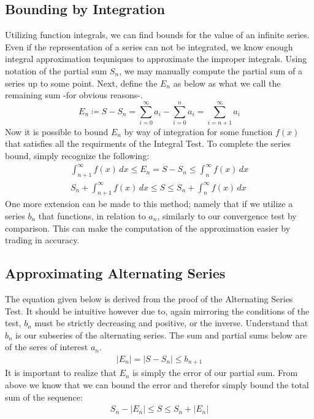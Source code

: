 \documentclass[11pt]{article}
\newcommand{\define}{\coloneqq}
\newcommand{\abs}[1]{\left| #1 \right|}
\begin{document}
	\subsection*{Bounding by Integration}
		Utilizing function integrals, we can find bounds for the value of an infinite series. Even if the representation of a series can not
		be integrated, we know enough integral approximation tequniques to approximate the improper integrals. Using notation of the 
		partial sum $S_n$, we may manually compute the partial sum of a series up to some point. Next, define the $E_n$ as below as what
		we call the remaining sum -for obvious reasons-.
			\begin{equation}
				E_n \define S - S_n = \sum_{i = 0}^{\infty} a_i - \sum_{i = 0}^{n} a_i = \sum_{i = n + 1}^{\infty} a_i
			\end{equation}
		Now it is possible to bound $E_n$ by way of integration for some function $f(x)$ that satisfies all the requirments of the Integral Test.
		To complete the series bound, simply recognize the following:
			\begin{align}
				\int_{n + 1}^{\infty} f(x) \, dx \leq E_n = S - S_n \leq \int_{n}^{\infty} f(x) \, dx\\
				S_n + \int_{n + 1}^{\infty} f(x) \, dx \leq S \leq S_n + \int_{n}^{\infty} f(x) \, dx
			\end{align}
		One more extension can be made to this method; namely that if we utilize a series $b_n$ that functions, in relation to $a_n$, similarly
		to our convergence test by comparison. This can make the computation of the approximation easier by trading in accuracy.

	\subsection*{Approximating Alternating Series}
		The equation given below is derived from the proof of the Alternating Series Test. It should be intuitive however due to, again mirroring
		the conditions of the test, $b_n$ must be strictly decreasing and positive, or the inverse. Understand that $b_n$ is our subseries of
		the alternating series. The sum and partial sums below are of the seres of interest $a_n$.
			\begin{align}
				\abs{E_n} = \abs{S - S_n} \leq b_{n + 1}
			\end{align}
		It is important to realize that $E_n$ is simply the error of our partial sum. From above we know that we can bound the error and therefor
		simply bound the total sum of the sequence:
			\begin{align}
				S_n - \abs{E_n} \leq S \leq S_n + \abs{E_n}
			\end{align}
\end{document}
